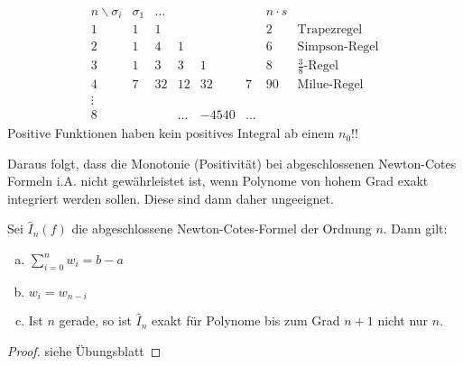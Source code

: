 \begin{align*}
  \begin{array}{cccccccl}
    n\backslash \sigma_i &\sigma_1&\dots&&&& n\cdot s\\
    1 & 1&1&&&&2& \text{Trapezregel}\\
    2&1&4&1&&&6 & \text{Simpson-Regel}\\
    3&1&3&3&1&&8& \text{$\frac{3}{8}$-Regel}\\
    4&7&32&12&32&7&90 & \text{Milue-Regel}\\
    \vdots\\
    8&&&\dots &-4540&\dots
  \end{array}
\end{align*}
Positive Funktionen haben kein positives Integral ab einem $n_0$!!




Daraus folgt, dass die Monotonie (Positivität) 
bei abgeschlossenen Newton-Cotes Formeln i.A. nicht gewährleistet ist,
wenn Polynome von hohem Grad exakt integriert werden sollen.
Diese sind dann daher ungeeignet.


\begin{Satze}\label{7.2.5}
  Sei $\hat{I}_n(f) $ die abgeschlossene Newton-Cotes-Formel
  der Ordnung $n$.
  Dann gilt:
  \begin{enumerate}[a)]
  \item $\sum_{i=0}^nw_i= b-a$
  \item $w_i=w_{n-i}$
  \item Ist $n$ gerade, so ist $\hat{I}_n$ exakt für Polynome bis zum
    Grad $n+1$ nicht nur $n$.
  \end{enumerate}

  \begin{proof} siehe Übungsblatt \end{proof}
\end{Satze}

